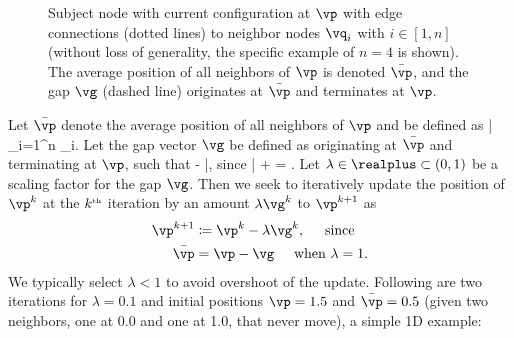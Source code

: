 \documentclass[11pt, oneside]{article}   	%
\begin{document}
\begin{figure}[htb]
  \begin{center}


  \end{center}

  \caption{Subject node with current configuration at $\vp$ with edge 
  connections (dotted lines) 
  to neighbor nodes $\vq_i$ 
  with $i \in [1, n]$ (without loss of generality, 
  the specific example of $n = 4$ is shown).  
  The average position of all neighbors of $\vp$ 
  is denoted $\bar{\vp}$, and the gap $\vg$ (dashed line) 
  originates at $\bar{\vp}$ and terminates at $\vp$.}
\label{fig:node_p} %
\end{figure}
Let $\bar{\vp}$ denote the average position of all neighbors of $\vp$ and be 
defined as
\be
  \bar{\vp} \coloneqq {} \sum_{i=1}^n \vq_i.
\ee
Let the gap vector $\vg$ be defined as originating at $\bar{\vp}$ and terminating
at $\vp$, such that
\be
 \vg \coloneqq \vp - \bar{\vp}, \;\;\; \mbox{since} \;\;\; \bar{\vp} + \vg = \vp.
\ee
Let $\lambda \in \realplus \subset (0, 1)$ be a scaling factor for the 
gap $\vg$.  Then we seek to iteratively update the position of $\vp^k$ at the
$k^{\mbox{\tiny th}}$ iteration by an amount $\lambda \vg^k$ to $\vp^{k+1}$ as
\begin{align}
  \vp^{k+1} & \coloneqq \vp^k - \lambda \vg^k, \hspace{0.5cm} \mbox{since} \\
  \bar{\vp} & = \vp - \vg \hspace{0.5cm} \mbox{when } \lambda = 1.
\end{align}
We typically select $\lambda < 1$ to avoid overshoot of the update.  Following
are two iterations for $\lambda = 0.1$ and initial positions $\vp = 1.5$ and
$\bar{\vp} = 0.5$ (given two neighbors, one at 0.0 and one at 1.0, that 
never move), a simple 1D example:
\end{document}
